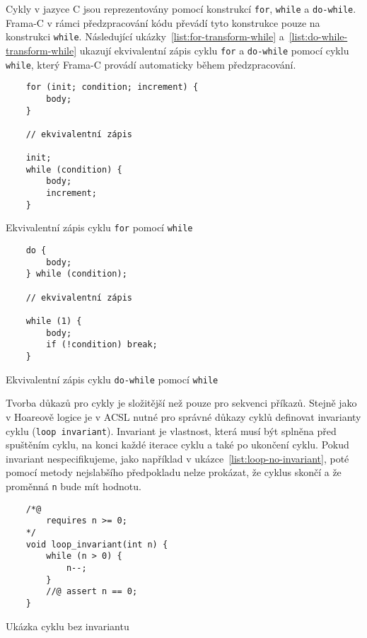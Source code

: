 Cykly v jazyce C jsou reprezentovány pomocí konstrukcí \texttt{for}, \texttt{while} a \texttt{do-while}.
Frama\mbox{-}C v rámci předzpracování kódu převádí tyto konstrukce pouze na konstrukci \texttt{while}.
Následující ukázky~\ref{list:for-transform-while} a~\ref{list:do-while-transform-while}
ukazují ekvivalentní zápis cyklu \texttt{for} a \texttt{do-while} pomocí cyklu \texttt{while},
který Frama\mbox{-}C provádí automaticky během předzpracování.

\begin{listing}[H]
    \begin{verbatim}
    for (init; condition; increment) {
        body;
    }

    // ekvivalentní zápis

    init;
    while (condition) {
        body;
        increment;
    }
    \end{verbatim}
    \caption{Ekvivalentní zápis cyklu \texttt{for} pomocí \texttt{while}}
    \label{list:for-transform-while}
\end{listing}

\begin{listing}[H]
    \begin{verbatim}
    do {
        body;
    } while (condition);

    // ekvivalentní zápis

    while (1) {
        body;
        if (!condition) break;
    }
    \end{verbatim}
    \caption{Ekvivalentní zápis cyklu \texttt{do-while} pomocí \texttt{while}}
    \label{list:do-while-transform-while}
\end{listing}

Tvorba důkazů pro cykly je složitější než pouze pro sekvenci příkazů.
Stejně jako v Hoareově logice je v ACSL nutné pro správné důkazy cyklů definovat invarianty cyklu (\texttt{loop invariant}).
Invariant je vlastnost, která musí být splněna před spuštěním cyklu,
na konci každé iterace cyklu a také po ukončení cyklu.
Pokud invariant nespecifikujeme, jako například v ukázce~\ref{list:loop-no-invariant},
poté pomocí metody nejslabšího předpokladu nelze prokázat,
že cyklus skončí a že proměnná \texttt{n} bude mít hodnotu.

\begin{listing}[H]
    \begin{verbatim}
    /*@
        requires n >= 0;
    */
    void loop_invariant(int n) {
        while (n > 0) {
            n--;
        }
        //@ assert n == 0;
    }
    \end{verbatim}
    \caption{Ukázka cyklu bez invariantu}
    \label{list:loop-no-invariant}
\end{listing}

